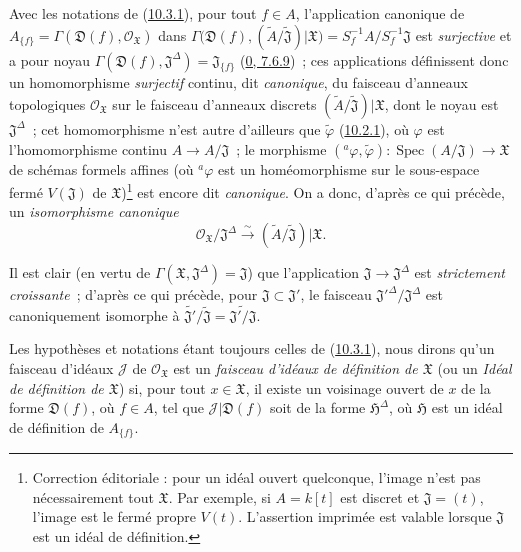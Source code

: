 \begin{env}[10.3.2]
\label{I.10.3.2-fr}
Avec les notations de (\hyperref[I.10.3.1-fr]{10.3.1}), pour tout $f\in A$,
l'application canonique de
$A_{\{f\}}=\Gamma(\mathfrak{D}(f),\mathscr{O}_{\mathfrak{X}})$ dans
$\Gamma\bigl(\mathfrak{D}(f),
(\widetilde{A}/\widetilde{\mathfrak{J}})|\mathfrak{X}\bigr)
=S_f^{-1}A/S_f^{-1}\mathfrak{J}$
est \emph{surjective} et a pour noyau
$\Gamma(\mathfrak{D}(f),\mathfrak{J}^\Delta)=\mathfrak{J}_{\{f\}}$
(\hyperref[0.7.6.9-fr]{0, 7.6.9})~; ces applications définissent donc un
homomorphisme \emph{surjectif} continu, dit \emph{canonique}, du faisceau
d'anneaux topologiques $\mathscr{O}_{\mathfrak{X}}$ sur le faisceau
d'anneaux discrets
$(\widetilde{A}/\widetilde{\mathfrak{J}})|\mathfrak{X}$, dont le noyau est
$\mathfrak{J}^\Delta$~; cet homomorphisme n'est autre d'ailleurs que
$\widetilde{\varphi}$ (\hyperref[I.10.2.1-fr]{10.2.1}), où $\varphi$ est
l'homomorphisme continu $A\to A/\mathfrak{J}$~; le morphisme
$({}^a\varphi,\widetilde{\varphi}):
\operatorname{Spec}(A/\mathfrak{J})\to\mathfrak{X}$ de schémas formels
affines (où ${}^a\varphi$ est un homéomorphisme sur le sous-espace fermé $V(\mathfrak{J})$ de $\mathfrak{X}$)\footnote{Correction éditoriale : pour un idéal ouvert quelconque, l'image n'est pas nécessairement tout $\mathfrak{X}$. Par exemple, si $A=k[t]$ est discret et $\mathfrak{J}=(t)$, l'image est le fermé propre $V(t)$. L'assertion imprimée est valable lorsque $\mathfrak{J}$ est un idéal de définition.} est encore dit \emph{canonique}. On a donc,
d'après ce qui précède, un \emph{isomorphisme canonique}
\[
  \mathscr{O}_{\mathfrak{X}}/\mathfrak{J}^\Delta
  \xrightarrow{\sim}
  (\widetilde{A}/\widetilde{\mathfrak{J}})|\mathfrak{X}.
  \tag{10.3.2.1}\label{I.10.3.2.1-fr}
\]

Il est clair (en vertu de
$\Gamma(\mathfrak{X},\mathfrak{J}^\Delta)=\mathfrak{J}$) que
l'application $\mathfrak{J}\to\mathfrak{J}^\Delta$ est
\emph{strictement croissante}~; d'après ce qui précède, pour
$\mathfrak{J}\subset\mathfrak{J}'$, le faisceau
${\mathfrak{J}'}^\Delta/\mathfrak{J}^\Delta$ est canoniquement isomorphe à
$\widetilde{\mathfrak{J}'}/\widetilde{\mathfrak{J}}
=\widetilde{\mathfrak{J}'/\mathfrak{J}}$.
\end{env}

\begin{env}[10.3.3]
\label{I.10.3.3-fr}
Les hypothèses et notations étant toujours celles de
(\hyperref[I.10.3.1-fr]{10.3.1}), nous dirons qu'un faisceau d'idéaux
$\mathscr{J}$ de $\mathscr{O}_{\mathfrak{X}}$ est un
\emph{faisceau d'idéaux de définition de $\mathfrak{X}$} (ou un
\emph{Idéal de définition de $\mathfrak{X}$}) si, pour tout
$x\in\mathfrak{X}$, il existe un voisinage ouvert de $x$ de la forme
$\mathfrak{D}(f)$, où $f\in A$, tel que
$\mathscr{J}|\mathfrak{D}(f)$ soit de la forme $\mathfrak{H}^\Delta$, où
$\mathfrak{H}$ est un idéal de définition de $A_{\{f\}}$.
\end{env}

